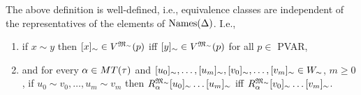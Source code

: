 
\begin{lemma}\label{label-element independence}
    The above definition is well-defined, i.e., equivalence classes are independent of the representatives of the elements of $\text{Names}(\Delta)$. I.e.,
    \begin{enumerate}
        \item if $x\sim y$ then $[x]_\sim\in V^{\mathfrak{M}_\sim}(p)$ iff $[y]_\sim\in V^{\mathfrak{M}_\sim}(p)$ for all $p \in$ PVAR,
        \item and for every $\alpha\in MT(\tau)$ and $[u_0]_\sim,\ldots,[u_m]_\sim,[v_0]_\sim,\ldots,[v_m]_\sim\in W_\sim$, $m\geq 0$, if $u_0\sim v_0, \ldots, u_m\sim v_m$ then $R^{\mathfrak{M}_\sim}_\alpha [u_0]_\sim\ldots [u_m]_\sim$ iff $R^{\mathfrak{M}_\sim}_\alpha
        [v_0]_\sim\ldots [v_m]_\sim$.
    \end{enumerate}
\end{lemma}


